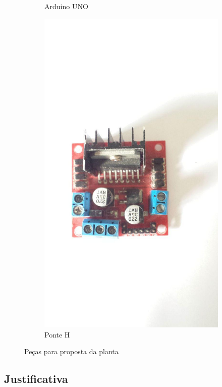 \documentclass[a4paper,11pt]{article}
\begin{document}
\begin{figure}[H]
\begin{subfigure}[b]{0.32\linewidth}
        \caption{Arduino UNO}
    \end{subfigure}
    \hfill
    \begin{subfigure}[b]{0.32\linewidth}
        \centering
        \includegraphics[width=0.9\linewidth]{src/tex/img/ponteH.jpg}
        \caption{Ponte H}
    \end{subfigure}
    \caption{Peças para proposta da planta}
    \label{fig:dispositivos}
\end{figure}

\subsection{Justificativa}
\end{document}
